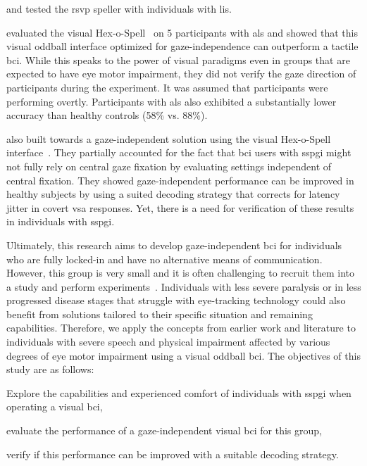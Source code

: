 \documentclass[twocolumn]{article}
\begin{document}
\textcite{Orhan2012} and \textcite{Oken2014} tested the \ac{rsvp} speller with
individuals with \ac{lis}.

\textcite{Severens2014} evaluated the visual Hex-o-Spell~\cite{Treder2010} on 5
participants with \ac{als} and showed that this visual oddball interface optimized
for gaze-independence can outperform a tactile \ac{bci}.
While this speaks to the power of visual paradigms even in groups that are
expected to have eye motor impairment, they did not verify the gaze direction
of participants during the experiment.
It was assumed that participants were performing overtly.
Participants with \ac{als} also exhibited a substantially lower accuracy than healthy
controls (58\% vs. 88\%).

\textcite{VanDenKerchove2024} also built towards a gaze-independent solution
using the visual Hex-o-Spell interface~\cite{VanDenKerchove2024}.
They partially accounted for the fact that \ac{bci} users with \ac{sspgi} might
not fully rely on central gaze fixation by evaluating settings independent of
central fixation.
They showed gaze-independent performance can be improved in healthy subjects by
using a suited decoding strategy that corrects for latency jitter in covert \ac{vsa} responses.
Yet, there is a need for verification of these results in individuals with
\ac{sspgi}.

Ultimately, this research aims to develop gaze-independent \ac{bci} for
individuals who are fully locked-in and have no alternative means of communication.
However, this group is very small and it is often challenging to recruit them
into a study and perform experiments~\cite{Wolpaw2006}.
Individuals with less severe paralysis or in less progressed disease stages that struggle with
eye-tracking technology could also benefit from
solutions tailored to their specific situation and remaining capabilities.
Therefore, we apply the concepts from earlier work and literature to
individuals with severe speech and physical impairment affected by various degrees of eye motor impairment
using a visual oddball \ac{bci}.
The objectives of this study are as follows:
\begin{enumerate*}[label={(\arabic*)}]
	\item Explore the capabilities and experienced comfort of individuals with
	      \ac{sspgi} when operating a visual \ac{bci},
	\item evaluate the performance of a gaze-independent visual \ac{bci} for this
	      group,
	\item verify if this performance can be improved with a suitable decoding
	      strategy.
\end{enumerate*}
\end{document}
